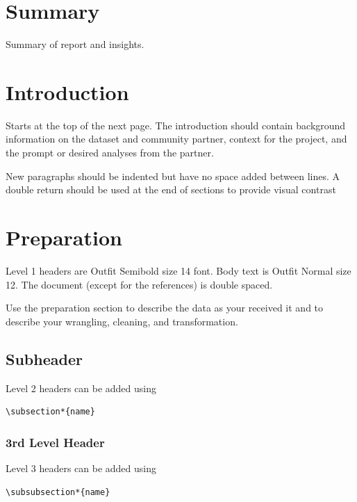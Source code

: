 \documentclass{template}
\begin{document}
\setlength{\parindent}{15pt}
\tableofcontents

\vspace{1\baselineskip}
\section*{Summary}
Summary of report and insights. 


\newpage

\section*{Introduction}
Starts at the top of the next page. The introduction should contain background information on the dataset and community partner, context for the project, and the prompt or desired analyses from the partner.

New paragraphs should be indented but have no space added between lines. A double return should be used at the end of sections to provide visual contrast


\section*{Preparation}

Level 1 headers are Outfit Semibold size 14 font. Body text is Outfit Normal size 12. The document (except for the references) is double spaced.

Use the preparation section to describe the data as your received it and to describe your wrangling, cleaning, and transformation.

\subsection*{Subheader}

Level 2 headers can be added using \begin{verbatim}
\subsection*{name}
\end{verbatim}

\subsubsection*{3rd Level Header}
Level 3 headers can be added using \begin{verbatim} 
\subsubsection*{name}
\end{verbatim}
\end{document}
